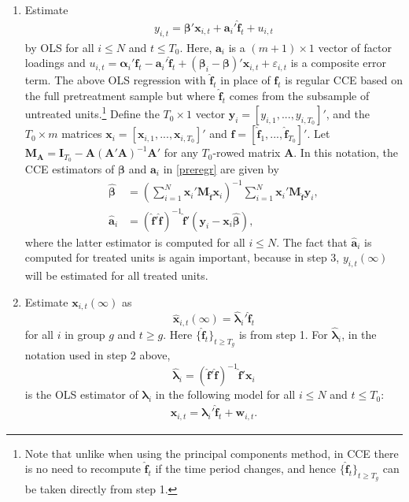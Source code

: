 \documentclass[12pt,fleqn]{article}
\def\*#1{\mathbf{#1}}
\def\+#1{\boldsymbol{#1}}
\begin{document}
\begin{enumerate}
\item Estimate
\begin{align}
y_{i,t} = \+\beta'\*x_{i,t} + \*a_i'\widehat{\*f}_t + u_{i,t}\label{preregr}
\end{align}
by OLS for all $i \leq N$ and $t \leq T_0$. Here, $\*a_i$ is a $(m+1)\times 1$ vector of factor loadings and $u_{i,t} = \+\alpha_i'\*f_t - \*a_i'\widehat{\*f}_t + (\+\beta_i-\+\beta)'\*x_{i,t} +  \varepsilon_{i,t}$ is a composite error term. The above OLS regression with $\widehat{\*f}_t$ in place of $\*f_t$ is regular CCE based on the full pretreatment sample but where $\widehat{\*f}_t$ comes from the subsample of untreated units.\footnote{Note that unlike when using the principal components method, in CCE there is no need to recompute $\widehat{\*f}_t$ if the time period changes, and hence $\{\widehat{\*f}_t\}_{t \geq T_g}$ can be taken directly from step 1.} Define the $T_0\times 1$ vector $\*y_{i} = [y_{i,1},...,y_{i,T_0}]'$, and the $T_0\times m$ matrices $\*x_{i} = [\*x_{i,1},...,\*x_{i,T_0}]'$ and $\widehat{\*f} = [\widehat{\*f}_{1},...,\widehat{\*f}_{T_0}]'$. Let $\*M_{\*A} = \*I_{T_0} - \*A(\*A'\*A)^{-1}\*A'$ for any $T_0$-rowed matrix $\*A$. In this notation, the CCE estimators of $\+\beta$ and $\*a_i$ in \eqref{preregr} are given by
\begin{align}
\widehat{\+\beta} &= \left(\sum_{i=1}^N  \*x_{i}'\*M_{\widehat{\*f}}\*x_{i}\right)^{-1}\sum_{i=1}^N \*x_{i}' \*M_{\widehat{\*f}}\*y_{i},\\
\widehat{\*a}_i &= (\widehat{\*f}'\widehat{\*f})^{-1}\widehat{\*f}'(\*y_{i}-\*x_{i}\widehat{\+\beta}),
\end{align}
where the latter estimator is computed for all $i\leq N$. The fact that $\widehat{\*a}_i$ is computed for treated units is again important, because in step 3, $y_{i,t}(\infty)$ will be estimated for all treated units.

\item Estimate $\*x_{i,t}(\infty)$ as
\begin{equation}
    \widehat{\*x}_{i,t}(\infty) = \widehat{\+\lambda}_i'\widehat{\*f}_t
\end{equation}
for all $i$ in group $g$ and $t \geq g$. Here $\{\widehat{\*f}_t\}_{t \geq T_g}$ is from step 1. For $\widehat{\+\lambda}_i$, in the notation used in step 2 above,
\begin{equation}
\widehat{\+\lambda}_i = ( \widehat{\*f}' \widehat{\*f} )^{-1} \widehat{\*f}' \*x_i
\end{equation}
is the OLS estimator of $\+\lambda_i$ in the following model for all $i \leq N$ and $t \leq T_0$:
\begin{align}
\*x_{i,t} = \+\lambda_i'\widehat{\*f}_t + \*w_{i,t}.
\end{align}


\end{enumerate}
\end{document}
